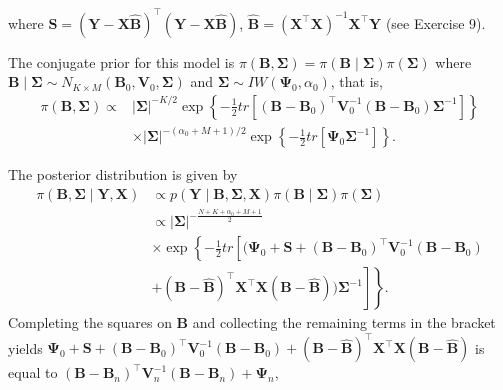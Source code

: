 where ${\bm{S}}= ({\bm{Y}}-{\bm{X}}\widehat{\bm{B}})^{\top}({\bm{Y}}-{\bm{X}}\widehat{\bm{B}})$, $\widehat{\bm{B}}= ({\bm{X}}^{\top}{\bm{X}})^{-1}{\bm{X}}^{\top}{\bm{Y}}$ (see Exercise 9).

The conjugate prior for this model is $\pi({\bm{B}},{\bm{\Sigma}})=\pi({\bm{B}}\mid {\bm{\Sigma}})\pi({\bm{\Sigma}})$ where ${\bm{B}}\mid {\bm \Sigma}\sim N_{K\times M}({\bm{B}}_{0},{\bm{V}}_{0},{\bm{\Sigma}})$ and ${\bm{\Sigma}}\sim IW({\bm{\Psi}}_{0},\alpha_{0})$, that is,
\begin{align*}
	\pi ({\bm{B}},{\bm{\Sigma}})\propto &\left|{\bm{\Sigma}} \right|^{-K/2}\exp\left\lbrace -\frac{1}{2}tr\left[({\bm{B}}-{\bm{B}}_{0})^{\top}{\bm{V}}_{0}^{-1}({\bm{B}}-{\bm{B}}_{0}){\bm \Sigma}^{-1}\right]\right\rbrace \\
	& \times \left|{\bm \Sigma} \right|^{-(\alpha_{0}+M+1)/2}\exp\left\lbrace -\frac{1}{2}tr \left[ {\bm{\Psi}}_{0} {\bm \Sigma}^{-1}\right] \right\rbrace.
\end{align*}

The posterior distribution is given by
\begin{align*}
	\pi({\bm{B}},{\bm{\Sigma}}\mid {\bm{Y}},{\bm{X}})&\propto  p({\bm{Y}}\mid {\bm{B}},{\bm{\Sigma}},{\bm{X}}) \pi({\bm{B}}\mid  {\bm \Sigma})\pi({\bm{\Sigma}})\\
	&\propto \left|{\bm{\Sigma}} \right|^{-\frac{N+K+\alpha_{0}+M+1}{2}}\\
	&\times\exp\left\lbrace -\frac{1}{2}tr\left[(\bm{\Psi}_{0}+{\bm{S}} +({\bm{B}}-{\bm{B}}_{0})^{\top}{\bm{V}}_{0}^{-1}({\bm{B}}-{\bm{B}}_{0})\right.\right.\\
	&\left.\left.   +({\bm{B}}-\widehat{\bm{B}})^{\top}{\bm{X}}^{\top}{\bm{X}}({\bm{B}}-\widehat{\bm{B}}))\bm{\Sigma}^{-1}\right]\right\rbrace .
\end{align*}
Completing the squares on ${\bm{B}}$ and collecting the remaining terms in the bracket yields ${\bm{\Psi}}_{0}+{\bm{S}} +({\bm{B}}-{\bm{B}}_{0})^{\top}{\bm{V}}_{0}^{-1}({\bm{B}}-{\bm{B}}_{0})+({\bm{B}}-\widehat{\bm{B}})^{\top}{\bm{X}}^{\top}{\bm{X}}({\bm{B}}-\widehat{\bm{B}})$ is equal to $({\bm{B}}-{\bm{B}}_n)^{\top}{\bm{V}}_n^{-1}({\bm{B}}-{\bm{B}}_n)+{\bm{\Psi}}_n$,

